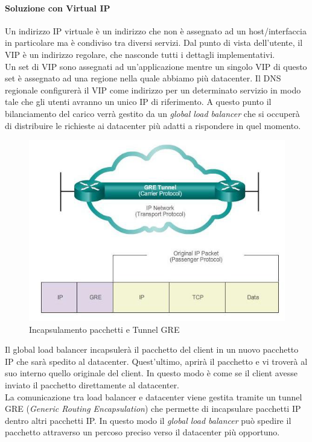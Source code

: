 \documentclass{article}
\begin{document}
\paragraph{Soluzione con Virtual IP}
Un indirizzo IP virtuale è un indirizzo che non è assegnato ad un host/interfaccia in particolare ma è condiviso tra diversi servizi. Dal punto di vista dell'utente, il VIP è un indirizzo regolare, che nasconde tutti i dettagli implementativi.\\
Un set di VIP sono assegnati ad un'applicazione mentre un singolo VIP di questo set è assegnato ad una regione nella quale abbiamo più datacenter. Il DNS regionale configurerà il VIP come indirizzo per un determinato servizio in modo tale che gli utenti avranno un unico IP di riferimento. A questo punto il bilanciamento del carico verrà gestito da un \textit{global load balancer} che si occuperà di distribuire le richieste ai datacenter più adatti a rispondere in quel momento.\\
\begin{figure}[H]
    \centering
    \includegraphics[scale=0.5]{img/gre.png}
    \caption{Incapsulamento pacchetti e Tunnel GRE}
\end{figure}\noindent
Il global load balancer incapsulerà il pacchetto del client in un nuovo pacchetto IP che sarà spedito al datacenter. Quest'ultimo, aprirà il pacchetto e vi troverà al suo interno quello originale del client. In questo modo è come se il client avesse inviato il pacchetto direttamente al datacenter.\\
La comunicazione tra load balancer e datacenter viene gestita tramite un tunnel GRE (\textit{Generic Routing Encapsulation}) che permette di incapsulare pacchetti IP dentro altri pacchetti IP. In questo modo il \textit{global load balancer} può spedire il pacchetto attraverso un percoso preciso verso il datacenter più opportuno.\footnotemark {}
\end{document}
